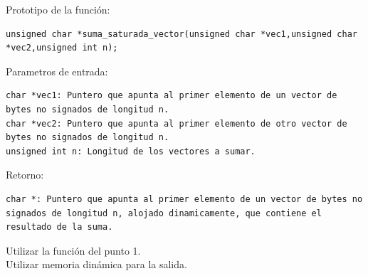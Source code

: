 \documentclass[12pt]{article} %
\begin{document}
\begin{enumerate}
Prototipo de la función:
\lstset{language=c,
	numbers=none,
	numberstyle=,
	numbersep=,
}

 \begin{lstlisting}
unsigned char *suma_saturada_vector(unsigned char *vec1,unsigned char *vec2,unsigned int n);
\end{lstlisting}

Parametros de entrada:
\lstset{language=c,
	numbers=none,
	numberstyle=,
	numbersep=,
}

 \begin{lstlisting}
char *vec1: Puntero que apunta al primer elemento de un vector de bytes no signados de longitud n.
char *vec2: Puntero que apunta al primer elemento de otro vector de bytes no signados de longitud n.
unsigned int n: Longitud de los vectores a sumar.
\end{lstlisting}

Retorno:
\lstset{language=c,
	numbers=none,
	numberstyle=,
	numbersep=,
}

 \begin{lstlisting}
char *: Puntero que apunta al primer elemento de un vector de bytes no signados de longitud n, alojado dinamicamente, que contiene el resultado de la suma.
\end{lstlisting}

Utilizar la función del punto 1.\\
Utilizar memoria dinámica para la salida.

\end{enumerate}
 
\end{document}

